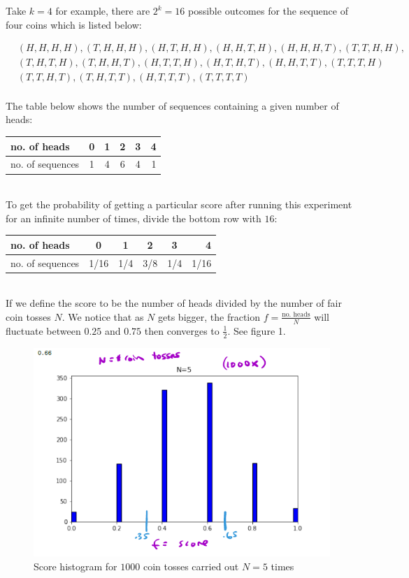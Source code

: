 \documentclass[12pt, a4paper]{article}
\newcounter{exa}
\begin{document}
Take $k=4$ for example, there are $2^k=16$ possible outcomes for the sequence of four coins which is listed below:

\begin{equation*}
\begin{split}
&(H,H,H,H), (T,H,H,H), (H,T,H,H), (H,H,T,H), (H,H,H,T), (T,T,H,H), \\
&(T,H,T,H), (T,H,H,T), (H,T,T,H), (H,T,H,T), (H,H,T,T), (T,T,T,H) \\
&(T,T,H,T), (T,H,T,T), (H,T,T,T), (T,T,T,T)
 \end{split}
\end{equation*} \\

The table below shows the number of sequences containing a given number of heads: \\

\begin{tabular}{l*{4}{c}r}
no. of heads & 0 & 1 & 2 & 3 & 4 \\
\hline
no. of sequences & 1 & 4 & 6 & 4 & 1
\end{tabular} \\

To get the probability of getting a particular score after running this experiment for an infinite number of times, divide the bottom row with $16$: \\

\begin{tabular}{l*{4}{c}r}
no. of heads & 0 & 1 & 2 & 3 & 4 \\
\hline
no. of sequences & 1/16 & 1/4 & 3/8 & 1/4 & 1/16
\end{tabular} \\

If we define the score to be the number of heads divided by the number of fair coin tosses $N$. We notice that as $N$ gets bigger, the fraction $f=\frac{\text{no. heads}}{N}$ will fluctuate between $0.25$ and $0.75$ then converges to $\frac{1}{2}$. See figure 1.

\begin{figure}[H]
\centering
\includegraphics[width=140mm]{2.png}
\caption{Score histogram for $1000$ coin tosses carried out $N=5$ times}
\end{figure}
\end{document}

